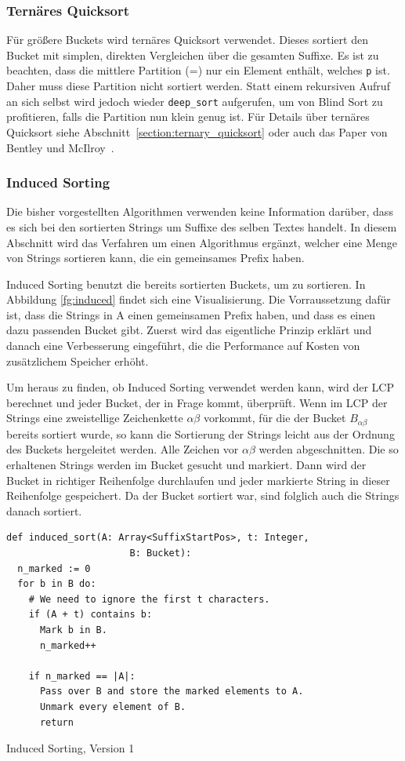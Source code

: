 \subsubsection{Ternäres Quicksort}
Für größere Buckets wird ternäres Quicksort verwendet.
Dieses sortiert den Bucket mit simplen, direkten Vergleichen über die gesamten Suffixe.
Es ist zu beachten, dass die mittlere Partition (\glqq =\grqq) nur ein Element enthält, welches \texttt{p} ist.
Daher muss diese Partition nicht sortiert werden.
Statt einem rekursiven Aufruf an sich selbst wird jedoch wieder \texttt{deep\_sort} aufgerufen, um von Blind Sort zu profitieren, falls die Partition nun klein genug ist.
Für Details über ternäres Quicksort siehe Abschnitt~\ref{section:ternary_quicksort} oder auch das Paper von Bentley und McIlroy~\cite{ternary_quicksort}.

\subsubsection{Induced Sorting}
Die bisher vorgestellten Algorithmen verwenden keine Information darüber, dass es sich bei den sortierten Strings um Suffixe des selben Textes handelt.
In diesem Abschnitt wird das Verfahren um einen Algorithmus ergänzt, welcher eine Menge von Strings sortieren kann, die ein gemeinsames Prefix haben.

Induced Sorting benutzt die bereits sortierten Buckets, um zu sortieren.
In Abbildung \ref{fg:induced} findet sich eine Visualisierung.
Die Vorraussetzung dafür ist, dass die Strings in A einen gemeinsamen Prefix haben, und dass es einen dazu passenden Bucket gibt.
Zuerst wird das eigentliche Prinzip erklärt und danach eine Verbesserung eingeführt, die die Performance auf Kosten von zusätzlichem Speicher erhöht.

Um heraus zu finden, ob Induced Sorting verwendet werden kann, wird der LCP berechnet und jeder Bucket, der in Frage kommt, überprüft.
Wenn im LCP der Strings eine zweistellige Zeichenkette $\alpha\beta$ vorkommt, für die der Bucket $B_{\alpha\beta}$ bereits sortiert wurde, so kann die Sortierung der Strings leicht aus der Ordnung des Buckets hergeleitet werden.
Alle Zeichen vor $\alpha\beta$ werden abgeschnitten.
Die so erhaltenen Strings werden im Bucket gesucht und markiert.
Dann wird der Bucket in richtiger Reihenfolge durchlaufen und jeder markierte String in dieser Reihenfolge gespeichert.
Da der Bucket sortiert war, sind folglich auch die Strings danach sortiert.

\begin{listing}[!t]
\begin{verbatim}
def induced_sort(A: Array<SuffixStartPos>, t: Integer,
                      B: Bucket):
  n_marked := 0
  for b in B do:
    # We need to ignore the first t characters.
    if (A + t) contains b:
      Mark b in B.
      n_marked++

    if n_marked == |A|:
      Pass over B and store the marked elements to A.
      Unmark every element of B.
      return
\end{verbatim}
\caption{Induced Sorting, Version 1~\cite{saca:4}}
\end{listing}

